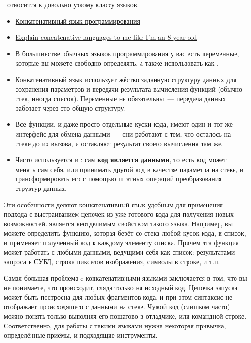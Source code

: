 \clearpage
{}\label{concat}

\F\ относится к довольно узкому классу  языков.

\begin{itemize}[nosep]
    \item \href{http://bit.ly/3924nEu}{Конкатенативный язык программирования}
    \item \href{https://stackoverflow.com/a/907336}{Explain concatenative
    languages to me like I'm an 8-year-old}
\end{itemize}

\begin{itemize}
    \item В большинстве обычных языков программирования у вас есть переменные,
    которые вы можете свободно определять, а также использовать как
    .
    \item Конкатенативный язык использует жёстко заданную структуру данных для
    сохранения параметров и передачи результата вычисления функций (обычно стек,
    иногда список). Переменные не обязательны\ --- передача данных работает
    через это общую структуру.
    \item Все функции, и даже просто отдельные куски кода, имеют один и тот же
    интерфейс для обмена данными\ --- они работают с тем, что осталось на стеке
    до их вызова, и оставляют результат своего вычисления там же.
    \item Часто используется и : сам \textbf{код является
    данными}, то есть код может менять сам себя, или принимать другой код в
    качестве параметра на стеке, и трансформировать его с помощью штатных
    операций преобразования структур данных.
\end{itemize}

Эти особенности деляют конкатенативный язык удобным для применения подхода с
выстраиванием цепочек из уже готового кода для получения новых возможностей.
 является неотделимым свойством такого языка.
Например, вы можете определить функцию, которая берёт со стека любой кусок кода,
и список, и применяет полученный код к каждому элементу списка. Причем эта
функция может работать с любыми данными, ведущими себя как список: результатами
запроса в СУБД, строка пикселов изображения, символы в строке, и т.п.

Самая большая проблема c конкатенативными языками заключается в том, что вы не
понимаете, что происходит, глядя только на исходный код. Цепочка запуска может
быть построена для любых фрагментов кода, и при этом синтаксис не отображает
происходящего с данными на стеке. Чужой код (слишком часто) можно понять только
выполняя его пошагово в отладчике, или командной строке. Соответственно, для
работы с такими языками нужна некоторая привычка, определённые
приёмы, и подходящие инструменты.

\clearpage
{}\label{instream}

\secup

